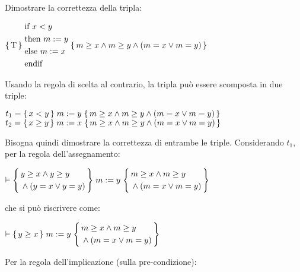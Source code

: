 \begin{exmp}
    Dimostrare la correttezza della tripla:
    \begin{center}
        $\Hoaretriple{\textnormal{T}}
        {\begin{aligned}
            & \textnormal{if } x<y\\
            & \textnormal{then } m:=y\\
            & \textnormal{else } m:=x\\
            & \textnormal{endif}
        \end{aligned}}
        {m \ge x \land m \ge y \land (m=x \lor m=y)}$
    \end{center}
    Usando la regola di scelta al contrario, la tripla può essere scomposta
    in due triple:
    \begin{center}
        $t_1 = \Hoaretriple{x<y}{m:=y}{m \ge x \land m \ge y \land (m=x \lor m=y)}$\\
        $t_2 = \Hoaretriple{x \ge y}{m:=x}{m \ge x \land m \ge y \land (m=x \lor m=y)}$
    \end{center}
    Bisogna quindi dimostrare la correttezza di entrambe le triple.
    Considerando $t_1$, per la regola dell'assegnamento:
    \begin{center}
        $\vDash \Hoaretriple{\begin{aligned}
            &y \ge x \land y \ge y\\
            &\land (y = x \lor y = y)
        \end{aligned}}
        {m:=y}
        {\begin{aligned}
            &m \ge x \land m \ge y\\
            &\land (m=x \lor m=y)
        \end{aligned}}$
    \end{center}
    che si può riscrivere come:
    \begin{center}
        $\vDash \Hoaretriple{y \ge x}{m:=y}
        {\begin{aligned}
            &m \ge x \land m \ge y\\
            &\land (m=x \lor m=y)
        \end{aligned}}$
    \end{center}
    Per la regola dell'implicazione (sulla pre-condizione):
    \begin{prooftree}
\end{prooftree}
\end{exmp}
